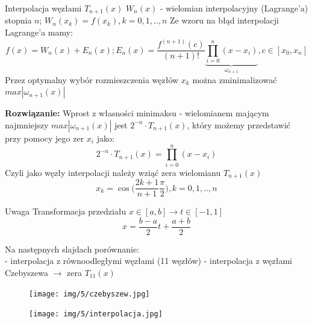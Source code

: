 \begin{frame}{Interpolacja  węzłami $T_{n+1}(x)$}
	$W_n(x)$ - wielomian interpolacyjny (Lagrange'a) stopnia $n$; $W_n(x_k) = f(x_k),k=0,1,..,n$
	Ze wzoru na błąd interpolacji Lagrange'a mamy:
    $$f(x) = W_n(x)+E_n(x); E_n(x) = \frac{f^{(n+1)}(c)}{(n+1)!}\underbrace{\prod_{i=0}^{n}(x-x_i)}_{\omega_{n+1}}
	, c \in [x_0,x_n]$$
    Przez optymalny wybór rozmieszczenia węzłów $x_k$ można zminimalizować $max|\omega_{n+1}(x)|$\newline
    \end{frame}
    \begin{frame}
   \textbf{Rozwiązanie:} Wprost z własności minimaksu - wielomianem mającym najmniejszy $max|\omega_{n+1}(x)|$ jest $2^{-n} \cdot T_{n+1}(x)$, który możemy przedstawić przy pomocy jego zer $x_i$ jako:
   $$2^{-n}\cdot T_{n+1}(x)=\prod_{i=0}^{n}(x-x_i)$$
    Czyli jako węzły interpolacji należy wziąć zera wielomianu $T_{n+1}(x)$
    $$x_k = \cos \Big(\frac{2k+1}{n+1}\frac{\pi}{2}\Big), k=0,1,..,n $$
    
\end{frame}
\begin{frame}
    \begin{block}{Uwaga}
        Transformacja przedziału $x \in [a,b] \rightarrow t \in [-1,1]$
        $$x=\frac{b-a}{2}t+\frac{a+b}{2}$$
    \end{block}
    Na następnych slajdach porównanie:\\
     - interpolacja z równoodległymi węzłami (11 węzłów)\newline
    - interpolacja z węzłami Czebyszewa $\rightarrow$ zera $T_{11}(x)$
\end{frame}
\begin{frame}
    \begin{figure}
        \texttt{[image: img/5/czebyszew.jpg]}
    \end{figure}
\end{frame}
\begin{frame}
    \begin{figure}
        \texttt{[image: img/5/interpolacja.jpg]}
    \end{figure}
\end{frame}
